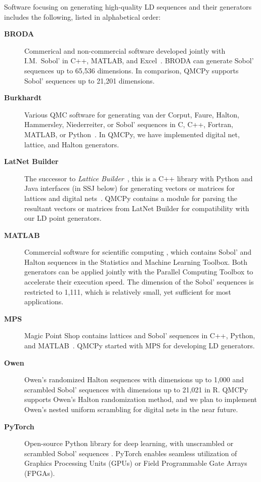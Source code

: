 \documentclass[graybox]{svmult}
\begin{document}
Software focusing on generating high-quality LD sequences and their generators includes the following, listed in alphabetical order:
\begin{description}%
	\item[\textbf{BRODA}] \sloppypar Commerical and non-commercial software developed jointly with I.M.~Sobol' in C++, MATLAB, and Excel~\cite{BRODA20a}. BRODA can generate Sobol' sequences up to 65,536 dimensions. In comparison, QMCPy supports Sobol' sequences up to 21,201 dimensions.	
	\item[\textbf{Burkhardt}] Various QMC software for generating van der Corput, Faure, Halton, Hammersley,  Niederreiter, or Sobol' sequences in C, C++, Fortran, MATLAB, or Python~\cite{Bur20a}. In QMCPy, we have implemented digital net, lattice, and Halton generators.
	\item[\textbf{LatNet Builder}] The successor to \emph{Lattice Builder}~\cite{LEcMun14a}, this is a C++ library with Python and Java interfaces (in SSJ below) for generating vectors or matrices for lattices and digital nets~\cite{LatNet,LEcEtal22a}. QMCPy contains a module for parsing the resultant vectors or matrices from LatNet Builder for compatibility with our LD point generators. %
	\item[\textbf{MATLAB}] Commercial software for scientific computing \cite{MAT9.10}, which contains Sobol' and Halton sequences in the Statistics and Machine Learning Toolbox. Both generators can be applied jointly with the Parallel Computing Toolbox to accelerate their execution speed. The  dimension of the Sobol' sequences is restricted to 1,111, which is relatively small, yet sufficient for most applications. 
	\item[\textbf{MPS}] Magic Point Shop contains lattices and Sobol' sequences in C++, Python, and MATLAB~\cite{Nuy17a}.   QMCPy started with MPS for developing LD generators.
	\item[\textbf{Owen}] Owen's randomized Halton sequences with dimensions up to 1,000 \cite{Owe20a} and scrambled Sobol' sequences with dimensions up to 21,021  \cite{owen1998scrambling, owen2021r}  in R. QMCPy  supports Owen's Halton randomization method, and we plan to implement Owen's nested uniform scrambling for digital nets in the near future.
	\item[\textbf{PyTorch}] Open-source Python library for deep learning, with unscrambled or scrambled Sobol' sequences \cite{NEURIPS2019_9015,PyTorch}. PyTorch enables seamless utilization of Graphics Processing Units (GPUs) or Field Programmable Gate Arrays (FPGAs).

\end{description}
\end{document}
